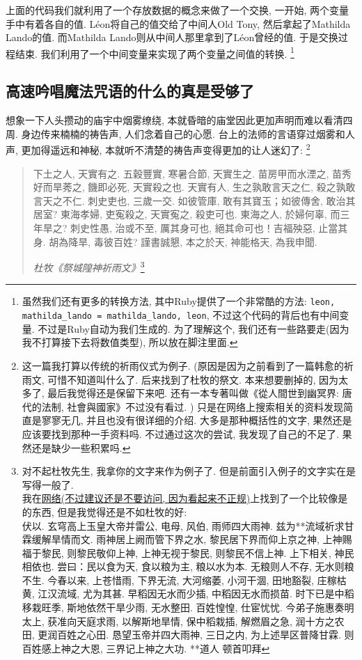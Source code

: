 上面的代码我们就利用了一个存放数据的概念来做了一个交换, 一开始, 两个变量手中有着各自的值. Léon将自己的值交给了中间人Old Tony, 然后拿起了Mathilda Lando的值. 而Mathilda Lando则从中间人那里拿到了Léon曾经的值. 于是交换过程结束. 我们利用了一个中间变量来实现了两个变量之间值的转换. \footnote{虽然我们还有更多的转换方法, 其中Ruby提供了一个非常酷的方法: \texttt{leon, mathilda_lando = mathilda_lando, leon}, 不过这个代码的背后也有中间变量. 不过是Ruby自动为我们生成的. 为了理解这个, 我们还有一些路要走(因为我不打算接下去将数值类型), 所以放在脚注里面. }

\subsection{高速吟唱魔法咒语的什么的真是受够了}
想象一下人头攒动的庙宇中烟雾缭绕, 本就昏暗的庙堂因此更加声明而难以看清四周. 身边传来楠楠的祷告声, 人们念着自己的心愿. 台上的法师的言语穿过烟雾和人声, 更加得遥远和神秘, 本就听不清楚的祷告声变得更加的让人迷幻了: \footnote{这一篇我打算以传统的祈雨仪式为例子. (原因是因为之前看到了一篇韩愈的祈雨文, 可惜不知道叫什么了. 后来找到了杜牧的祭文. 本来想要删掉的, 因为太多了, 最后我觉得还是保留下来吧. 还有一本专著叫做《從人間世到幽冥界: 唐代的法制, 社會與國家》不过没有看过. ) 只是在网络上搜索相关的资料发现简直是寥寥无几, 并且也没有很详细的介绍. 大多是那种概括性的文字, 果然还是应该要找到那种一手资料吗. 不过通过这次的尝试, 我发现了自己的不足了. 果然还是缺少一些积累吗. }

\begin{quotation}
  下土之人, 天實有之. 五穀豐實, 寒暑合節, 天實生之. 苗房甲而水湮之, 苗秀好而旱莠之, 饑即必死, 天實殺之也. 天實有人, 生之孰敢言天之仁, 殺之孰敢言天之不仁. 刺史吏也, 三歲一交. 如彼管庫, 敢有其寶玉；如彼傳舍, 敢治其居室? 東海孝婦, 吏寃殺之, 天實寃之, 殺吏可也. 東海之人, 於婦何辜, 而三年旱之? 刺史性愚, 治或不至, 厲其身可也, 絕其命可也！吉福殃惡, 止當其身. 胡為降旱, 毒彼百姓? 謹書誠懇, 本之於天, 神能格天, 為我申聞. 

  \emph{杜牧《祭城隍神祈雨文》}\footnote{对不起杜牧先生, 我拿你的文字来作为例子了. 但是前面引入例子的文字实在是写得一般了. \\ 我在\href{https://m.djol.org/show-34-11627-1.html}{网络(不过建议还是不要访问, 因为看起来不正规)}上找到了一个比较像是的东西, 但是我觉得还是不如杜牧的好: \\
  伏以. 玄穹高上玉皇大帝并雷公, 电母, 风伯, 雨师四大雨神. 兹为**流域祈求甘霖缓解旱情而文. 雨神居上阙而管下界之水, 黎民居下界而仰上京之神, 上神赐福于黎民, 则黎民敬仰上神, 上神无视于黎民, 则黎民不信上神. 上下相关, 神民相依也. 尝曰：民以食为天, 食以粮为主, 粮以水为本. 无粮则人不存, 无水则粮不生. 今春以来, 上苍惜雨, 下界无流, 大河缩萎, 小河干涸, 田地豁裂, 庄稼枯黄, 江汉流域, 尤为其甚. 早稻因无水而少插, 中稻因无水而损苗. 时下已是中稻移栽旺季, 斯地依然干旱少雨, 无水整田. 百姓惶惶, 仕宦忧忧. 今弟子施惠奏明太上, 获准向天庭求雨, 以解斯地旱情, 保中稻栽插, 解燃眉之急, 润十方之农田, 更润百姓之心田. 恳望玉帝并四大雨神, 三日之内, 为上述旱区普降甘霖. 则百姓感上神之大恩, 三界记上神之大功. **道人 顿首叩拜}
\end{quotation}

